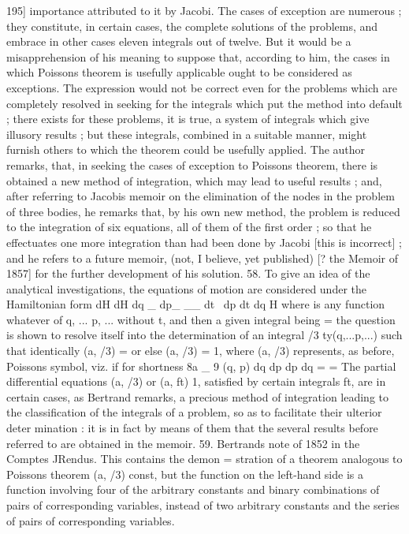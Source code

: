 \documentclass[11pt,a4paper]{book}
\begin{document}
195]
importance attributed to it by Jacobi. The cases of exception are numerous ; they
constitute, in certain cases, the complete solutions of the problems, and embrace in
other cases eleven integrals out of twelve. But it would be a misapprehension of his
meaning to suppose that, according to him, the cases in which Poissons theorem is
usefully applicable ought to be considered as exceptions. The expression would not be
correct even for the problems which are completely resolved in seeking for the integrals
which put the method into default ; there exists for these problems, it is true, a
system of integrals which give illusory results ; but these integrals, combined in a
suitable manner, might furnish others to which the theorem could be usefully applied.
The author remarks, that, in seeking the cases of exception to Poissons theorem,
there is obtained a new method of integration, which may lead to useful results ;
and, after referring to Jacobis memoir on the elimination of the nodes in the problem
of three bodies, he remarks that, by his own new method, the problem is reduced
to the integration of six equations, all of them of the first order ; so that he
effectuates one more integration than had been done by Jacobi [this is incorrect] ;
and he refers to a future memoir, (not, I believe, yet published) [? the Memoir of
1857] for the further development of his solution.
58. To give an idea of the analytical investigations, the equations of motion are
considered under the Hamiltonian form
dH dH
dq _ dp_
__
dt~ dp dt dq
H
where is any function whatever of q, ... p, ... without t, and then a given integral
being
=
the question is shown to resolve itself into the determination of an integral /3 ty(q,...p,...)
such that identically (a, /3) = or else (a, /3) = 1, where (a, /3) represents, as before,
Poissons symbol, viz.
if for shortness
8a _
9 (q, p) dq dp dp dq
= =
The partial differential equations (a, /3) or (a, ft) 1, satisfied by certain integrals ft,
are in certain cases, as Bertrand remarks, a precious method of integration leading to
the classification of the integrals of a problem, so as to facilitate their ulterior deter
mination : it is in fact by means of them that the several results before referred to
are obtained in the memoir.
59. Bertrands note of 1852 in the Comptes JRendus. This contains the demon
=
stration of a theorem analogous to Poissons theorem (a, /3) const, but the function
on the left-hand side is a function involving four of the arbitrary constants and
binary combinations of pairs of corresponding variables, instead of two arbitrary constants
and the series of pairs of corresponding variables.
\end{document}
